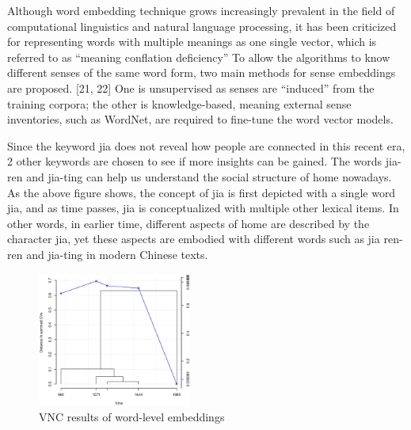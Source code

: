 Although word embedding technique grows increasingly prevalent in the field of computational linguistics and natural language processing, it has been criticized for representing words with multiple meanings as one single vector, which is referred to as ``meaning conflation deficiency'' \parencite{camacho2018survey} To allow the algorithms to know different senses of the same word form, two main methods for sense embeddings are proposed. [21, 22] One is unsupervised as senses are ``induced'' from the training corpora; the other is knowledge-based, meaning external sense inventories, such as WordNet, are required to fine-tune the word vector models. 

Since the keyword jia does not reveal how people are connected in this recent era, 2 other keywords are chosen to see if more insights can be gained. The words jia-ren and jia-ting can help us understand the social structure of home nowadays. As the above figure shows, the concept of jia is first depicted with a single word jia, and as time passes, jia is conceptualized with multiple other lexical items. In other words, in earlier time, different aspects of home are described by the character jia, yet these aspects are embodied with different words such as jia ren-ren and jia-ting in modern Chinese texts.


\begin{figure}[H]
\centering
\includegraphics[height=0.45\textheight,width=0.45\textwidth,keepaspectratio]{figures/sim_cor.eps}
\caption{VNC results of word-level embeddings}
\label{fig:sim_VNC}
\end{figure}


